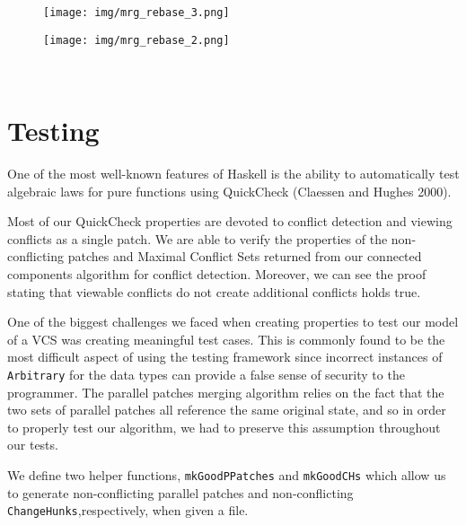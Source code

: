 \documentclass[]{article}
\makeatletter
\def\maxwidth{\ifdim\Gin@nat@width>\linewidth\linewidth
\else\Gin@nat@width\fi}
\let\Oldincludegraphics\includegraphics
\renewcommand{\includegraphics}[1]{\Oldincludegraphics[width=\maxwidth]{#1}}
\makeatother
\begin{document}
\begin{figure}[Figure 7]
\centering
\texttt{[image: img/mrg\_rebase\_3.png]}
\caption{}
\end{figure}

\begin{figure}[Figure 8]
\centering
\texttt{[image: img/mrg\_rebase\_2.png]}
\caption{}
\end{figure}

\begin{figure}[Figure 9]
\centering
\mbox{
\quad
{}}
\caption{}
\end{figure}

\begin{figure}[Figure 10]
\centering
\caption{}
\end{figure}

\section{Testing}

One of the most well-known features of Haskell is the ability to
automatically test algebraic laws for pure functions using QuickCheck
(Claessen and Hughes 2000).

Most of our QuickCheck properties are devoted to conflict detection and
viewing conflicts as a single patch. We are able to verify the
properties of the non-conflicting patches and Maximal Conflict Sets
returned from our connected components algorithm for conflict detection.
Moreover, we can see the proof stating that viewable conflicts do not
create additional conflicts holds true.

One of the biggest challenges we faced when creating properties to test
our model of a VCS was creating meaningful test cases. This is commonly
found to be the most difficult aspect of using the testing framework
since incorrect instances of \texttt{Arbitrary} for the data types can
provide a false sense of security to the programmer. The parallel
patches merging algorithm relies on the fact that the two sets of
parallel patches all reference the same original state, and so in order
to properly test our algorithm, we had to preserve this assumption
throughout our tests.

We define two helper functions, \texttt{mkGoodPPatches} and
\texttt{mkGoodCHs} which allow us to generate non-conflicting parallel
patches and non-conflicting \texttt{ChangeHunks},respectively, when
given a file.
\end{document}
